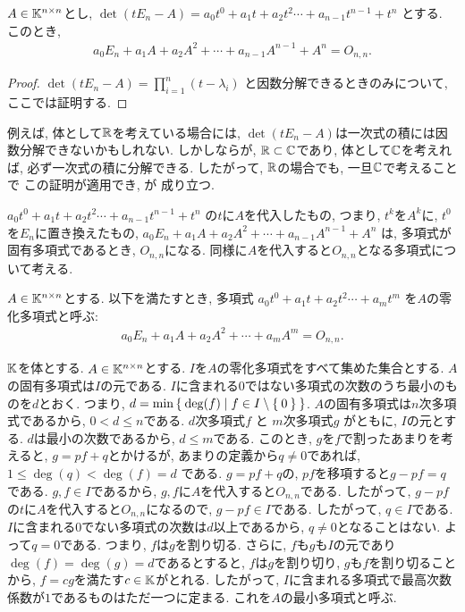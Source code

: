 \begin{prop}
\label{prop:chthm}
$A\in \mathbb{K}^{n\times n}$とし,
$\det(tE_n-A)=a_0t^0+a_1t+a_2t^2\cdots+a_{n-1}t^{n-1}+t^n$
とする.
このとき,
\begin{align*}
a_0E_n+a_1A+a_2A^2+\cdots+a_{n-1}A^{n-1}+A^n=O_{n,n}.
\end{align*}
\end{prop}
\begin{proof}
$\det(tE_n-A)=\prod_{i=1}^n (t-\lambda_i)$
と因数分解できるときのみについて,
ここでは証明する.
\end{proof}
\begin{remark}
例えば,
体として$\mathbb{R}$を考えている場合には,
$\det(tE_n-A)$は一次式の積には因数分解できないかもしれない.
しかしならが,
$\mathbb{R}\subset\mathbb{C}$であり,
体として$\mathbb{C}$を考えれば,
必ず一次式の積に分解できる.
したがって,
$\mathbb{R}$の場合でも,
一旦$\mathbb{C}$で考えることで
この証明が適用でき,
が
成り立つ.
\end{remark}
$a_0t^0+a_1t+a_2t^2\cdots+a_{n-1}t^{n-1}+t^n$
の$t$に$A$を代入したもの, つまり, $t^k$を$A^k$に, $t^0$を$E_n$に置き換えたもの,
$a_0E_n+a_1A+a_2A^2+\cdots+a_{n-1}A^{n-1}+A^n$
は,
多項式が固有多項式であるとき, $O_{n,n}$になる.
同様に$A$を代入すると$O_{n,n}$となる多項式について考える.
\begin{definition}
$A\in\mathbb{K}^{n\times n}$とする.
以下を満たすとき,
多項式
$a_0t^0+a_1t+a_2t^2\cdots+a_{m}t^{m}$
を$A$の零化多項式と呼ぶ:
\begin{align*}
a_0E_n+a_1A+a_2A^2+\cdots+a_mA^m=O_{n,n}.
\end{align*}
\end{definition}

$\mathbb{K}$を体とする.
$A\in\mathbb{K}^{n\times n}$とする.
$I$を$A$の零化多項式をすべて集めた集合とする.
$A$の固有多項式は$I$の元である.
$I$に含まれる$0$ではない多項式の次数のうち最小のものを$d$とおく.
つまり,
$d=\min\Set{ \deg(f) |f \in I\setminus\Set{0}}$.
$A$の固有多項式は$n$次多項式であるから,
$0<d\leq n$である.
$d$次多項式$f$
と
$m$次多項式$g$
がともに, $I$の元とする.
$d$は最小の次数であるから,
$d\leq m$である.
このとき,
$g$を$f$で割ったあまりを考えると,
$g=pf+q$とかけるが,
あまりの定義から$q\neq 0$であれば, $1\leq \deg(q)<\deg(f)=d$
である.
$g=pf+q$の, $pf$を移項すると$g-pf=q$である.
$g,f\in I$であるから, $g,f$に$A$を代入すると$O_{n,n}$である.
したがって,
$g-pf$の$t$に$A$を代入すると$O_{n,n}$になるので,
$g-pf\in I$である.
したがって, $q\in I$である.
$I$に含まれる$0$でない多項式の次数は$d$以上であるから,
$q\neq 0$となることはない.
よって$q=0$である.
つまり, $f$は$g$を割り切る.
さらに, $f$も$g$も$I$の元であり$\deg(f)=\deg(g)=d$であるとすると,
$f$は$g$を割り切り, $g$も$f$を割り切ることから,
$f=cg$を満たす$c\in\mathbb{K}$がとれる.
したがって,
$I$に含まれる多項式で最高次数係数が$1$であるものはただ一つに定まる.
これを$A$の最小多項式と呼ぶ.

